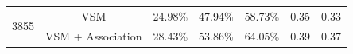 \documentclass[conference]{IEEEtran}
\begin{document}
\begin{table}[htbp]
{\begin{tabular}{c|c|c|c|c|c|c}
			\multirow{2}{*}{3855}                                                                               & VSM & 24.98\% & 47.94\% & 58.73\% & 0.35 & 0.33 \\  \cline{2-7}   &VSM + Association     & 28.43\%                                                 & 53.86\%                                                 & 64.05\%                                                  &   0.39  &  0.37    \\ 
			\hline
	\end{tabular}}
	\centering
\end{table}
\end{document}

